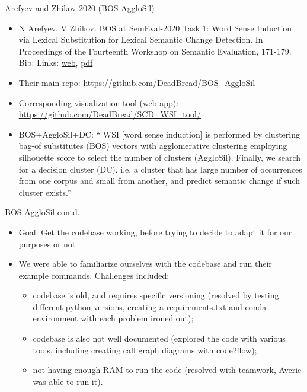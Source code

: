 \documentclass[10pt]{beamer}
\begin{document}
\begin{frame}{Arefyev and Zhikov 2020 (BOS AggloSil)}
\begin{itemize}
    \item 
N Arefyev, V Zhikov. BOS at SemEval-2020 Task 1: Word Sense Induction via Lexical Substitution for Lexical Semantic Change Detection. In Proceedings of the Fourteenth Workshop on Semantic Evaluation, 171-179.
Bib: \cite{arefyev-zhikov-2020-bos}
Links:
\href{https://aclanthology.org/2020.semeval-1.20/}{web},
\href{https://aclanthology.org/2020.semeval-1.20.pdf}{pdf}


    \item
    Their main repo: 
    \url{https://github.com/DeadBread/BOS_AggloSil}
    
    \item
    Corresponding visualization tool (web app): 
    \url{https://github.com/DeadBread/SCD_WSI_tool/}

    \item BOS+AggloSil+DC:
    \enquote{%
    WSI [word sense induction] is performed by clustering bag-of substitutes (BOS) vectors with agglomerative clustering employing silhouette score to select the number of clusters (AggloSil).
    Finally, we search for a decision cluster (DC), i.e. a cluster that has large number of occurrences from one corpus and small from another, and predict semantic change if such cluster exists.}
\end{itemize}
\end{frame}

\begin{frame}{BOS AggloSil contd.}
    \begin{itemize}
        \item Goal: Get the codebase working, before trying to decide to adapt it for our purposes or not
        
        \item We were able to familiarize ourselves with the codebase and run their example commands. 
    Challenges included: 
    \begin{itemize}
        \item codebase is old, and requires specific versioning (resolved by testing different python versions, creating a requirements.txt and conda environment with each problem ironed out);
        \item codebase is also not well documented (explored the code with various tools, including creating call graph diagrams with code2flow);
        \item not having enough RAM to run the code (resolved with teamwork, Averie was able to run it).
        \end{itemize}
        
    \end{itemize}
\end{frame}
\end{document}
